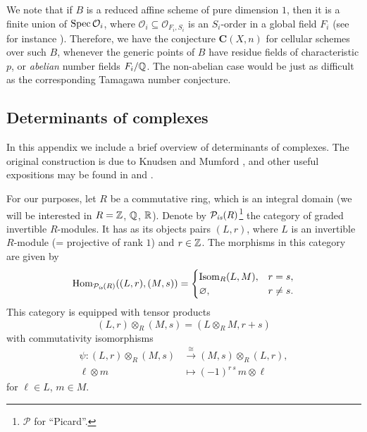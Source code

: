 \documentclass{article}
\numberwithin{equation}{section}
\begin{document}
We note that if $B$ is a reduced affine scheme of pure dimension $1$, then it is
a finite union of $\operatorname{Spec} \mathcal{O}_i$, where
$\mathcal{O}_i \subseteq \mathcal{O}_{F_i,S_i}$ is an $S_i$-order in a global
field $F_i$ (see for instance \cite[Proposition~4.2]{Jordan-Poonen-2020}).
Therefore, we have the conjecture $\mathbf{C} (X,n)$ for cellular schemes over
such $B$, whenever the generic points of $B$ have residue fields of
characteristic $p$, or \emph{abelian} number fields $F_i/\mathbb{Q}$. The non-abelian
case would be just as difficult as the corresponding Tamagawa number conjecture.


\pagebreak

\begin{appendices}
\section{Determinants of complexes}
\label{app:determinants}

In this appendix we include a brief overview of determinants of complexes.
The original construction is due to Knudsen and Mumford
\cite{Knudsen-Mumford-1976}, and other useful expositions may be found in
\cite[Appendix~A]{Gelfand-Kapranov-Zelevinsky-1994} and
\cite[\S 2.1]{Kato-1993}.

For our purposes, let $R$ be a commutative ring, which is an integral domain
(we will be interested in $R = \mathbb{Z}$, $\mathbb{Q}$, $\mathbb{R}$). Denote by
$\mathcal{P}_{\text{\it is}} (R)$\footnote{$\mathcal{P}$ for ``Picard''.} the category of
graded invertible $R$-modules. It has as its objects pairs $(L,r)$, where $L$ is
an invertible $R$-module (= projective of rank $1$) and $r \in \mathbb{Z}$. The
morphisms in this category are given by
\[ \operatorname{Hom}_{\mathcal{P}_{\text{\it is}} (R)} ((L,r), (M,s)) = \begin{cases}
    \operatorname{Isom}_R (L,M), & r = s, \\
    \varnothing, & r \ne s.
  \end{cases} \]
This category is equipped with tensor products
$$(L,r) \otimes_R (M,s) = (L\otimes_R M, r + s)$$
with commutativity isomorphisms
\begin{align*}
  \psi\colon (L,r) \otimes_R (M,s) & \xrightarrow{\cong}
                                     (M,s) \otimes_R (L,r), \\
  \ell \otimes m & \mapsto (-1)^{r\,s}\,m\otimes \ell
\end{align*}
for $\ell \in L$, $m \in M$.


\end{appendices}
\end{document}
